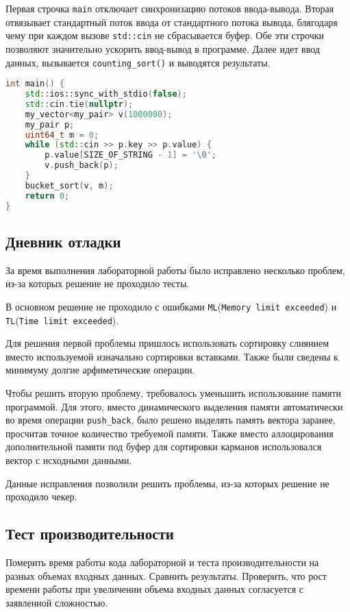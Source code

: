 \documentclass[12pt]{article}
\begin{document}
Первая строчка \texttt{main} отключает синхронизацию потоков ввода-вывода. Вторая отвязывает стандартный поток ввода от стандартного потока вывода, блягодаря чему при каждом вызове \texttt{std::cin} не сбрасывается буфер. Обе эти строчки позволяют значительно ускорить ввод-вывод в программе. Далее идет ввод данных, вызывается \texttt{counting\_sort()} и выводятся результаты.

\begin{lstlisting}[language=C++]
int main() {
    std::ios::sync_with_stdio(false);
    std::cin.tie(nullptr);
    my_vector<my_pair> v(1000000);
    my_pair p;
    uint64_t m = 0;
    while (std::cin >> p.key >> p.value) {
        p.value[SIZE_OF_STRING - 1] = '\0';
        v.push_back(p);
    }
    bucket_sort(v, m);
    return 0;
}
\end{lstlisting}

\subsection*{Дневник отладки}

За время выполнения лабораторной работы было исправлено несколько проблем, из-за которых решение не проходило тесты.

В основном решение не проходило с ошибками \texttt{ML}(\texttt{Memory limit exceeded}) и \texttt{TL}(\texttt{Time limit exceeded}). 

Для решения первой проблемы пришлось использовать сортировку слиянием вместо используемой изначально сортировки вставками. Также были сведены к минимуму долгие арфиметические операции.

Чтобы решить вторую проблему, требовалось уменьшить использование памяти программой. Для этого, вместо динамического выделения памяти автоматически во время операции \texttt{push\_back}, было решено выделять память вектора заранее, просчитав точное количество требуемой памяти. Также вместо аллоцирования дополнительной памяти под буфер для сортировки карманов использовался вектор с исходными данными.

Данные исправления позволили решить проблемы, из-за которых решение не проходило чекер.

\subsection*{Тест производительности}

Померить время работы кода лабораторной и теста производительности
на разных объемах входных данных. Сравнить результаты. Проверить,
что рост времени работы при увеличении объема входных данных
согласуется с заявленной сложностью.
\end{document}
